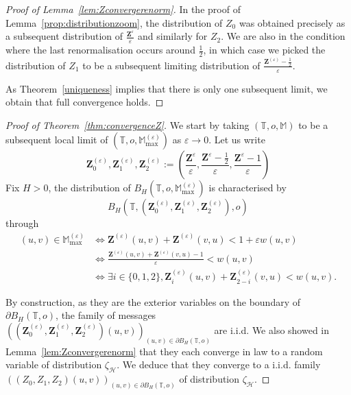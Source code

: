 \documentclass[11pt]{article}
\newcommand{\eps}{\varepsilon}
\begin{document}
\begin{proof}[Proof of Lemma~\ref{lem:Zconvergerenorm}]
    In the proof of Lemma~\ref{prop:distributionzoom}, the distribution of $Z_0$ was obtained precisely as a subsequent distribution of $\frac{\mathbf{Z}^{\eps}}{\eps}$ and similarly for $Z_2$. We are also in the condition where the last renormalisation occurs around $\frac{1}{2}$, in which case we picked the distribution of $Z_1$ to be a subsequent limiting distribution of $\frac{\mathbf{Z}^{(\eps)}-\frac{1}{2}}{\eps}$.

    As Theorem~\ref{uniqueness} implies that there is only one subsequent limit, we obtain that full convergence holds.
\end{proof}

\begin{proof}[Proof of Theorem~\ref{thm:convergenceZ}]
    We start by taking $(\mathbb{T},o,\mathbb{M})$ to be a subsequent local limit of $(\mathbb{T},o,
    \mathbb{M}_{\max}^{(\eps)})$ as $\eps \to 0$.
    Let us write \[ \mathbf{Z}_0^{(\eps)},\mathbf{Z}_1^{(\eps)},\mathbf{Z}_2^{(\eps)}:=  \left(\frac{\mathbf{Z}^{\eps}}{\eps},\frac{\mathbf{Z}^{\eps}-\frac{1}{2}}{\eps},\frac{\mathbf{Z}^{\eps}-1}{\eps} \right)\]
    Fix $H>0$, the distribution of $B_H(\mathbb{T},o, \mathbb{M}_{\max}^{(\eps)} )$ is characterised by \[ B_H\left(\mathbb{T}, \left(\mathbf{Z}_0^{(\eps)},\mathbf{Z}_1^{(\eps)},\mathbf{Z}_2^{(\eps)} \right) ,o\right)   \]
    through
    \begin{align*}
     (u,v) \in \mathbb{M}_{\max}^{(\eps)} &\iff \mathbf{Z}^{(\eps)}(u,v)+\mathbf{Z}^{(\eps)}(v,u)<1+ \eps w(u,v)  \\
     &\iff \frac{\mathbf{Z}^{(\eps)}(u,v)+\mathbf{Z}^{(\eps)}(v,u)-1}{\eps}<  w(u,v) \\
     &\iff \exists i \in \{0,1,2\}, \mathbf{Z}_i^{(\eps)}(u,v)+\mathbf{Z}_{2-i}^{(\eps)}(v,u)<w(u,v).
     \end{align*}

     By construction, as they are the exterior variables on the boundary of $\partial B_H(\mathbb{T},o)$, the family of messages $\left(\left(\mathbf{Z}_0^{(\eps)},\mathbf{Z}_1^{(\eps)},\mathbf{Z}_2^{(\eps)} \right)(u,v)\right)_{(u,v) \in \partial B_H (\mathbb{T},o)}$ are i.i.d. We also showed in Lemma~\ref{lem:Zconvergerenorm} that they each converge in law to a random variable of distribution $\zeta_{\mathcal{H}}$. We deduce that they converge to a i.i.d. family $((Z_0,Z_1,Z_2)(u,v))_{(u,v) \in \partial B_H (\mathbb{T},o)}$ of distribution $\zeta_{\mathcal{H}}$.
    

\end{proof}
\end{document}
